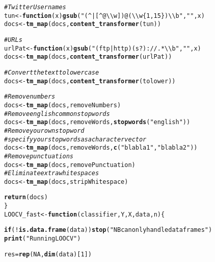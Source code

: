 \documentclass{article}\usepackage[]{graphicx}\usepackage[]{color}
\makeatletter
\newcommand{\hlnum}[1]{\textcolor[rgb]{0.686,0.059,0.569}{#1}}%
\newcommand{\hlstr}[1]{\textcolor[rgb]{0.192,0.494,0.8}{#1}}%
\newcommand{\hlcom}[1]{\textcolor[rgb]{0.678,0.584,0.686}{\textit{#1}}}%
\newcommand{\hlopt}[1]{\textcolor[rgb]{0,0,0}{#1}}%
\newcommand{\hlstd}[1]{\textcolor[rgb]{0.345,0.345,0.345}{#1}}%
\newcommand{\hlkwa}[1]{\textcolor[rgb]{0.161,0.373,0.58}{\textbf{#1}}}%
\newcommand{\hlkwb}[1]{\textcolor[rgb]{0.69,0.353,0.396}{#1}}%
\newcommand{\hlkwc}[1]{\textcolor[rgb]{0.333,0.667,0.333}{#1}}%
\newcommand{\hlkwd}[1]{\textcolor[rgb]{0.737,0.353,0.396}{\textbf{#1}}}%
\newenvironment{kframe}{%
 \def\at@end@of@kframe{}%
 \ifinner\ifhmode%
  \def\at@end@of@kframe{\end{minipage}}%
  \begin{minipage}{\columnwidth}%
 \fi\fi%
 \def\FrameCommand##1{\hskip\@totalleftmargin \hskip-\fboxsep
 \colorbox{shadecolor}{##1}\hskip-\fboxsep
     \hskip-\linewidth \hskip-\@totalleftmargin \hskip\columnwidth}%
 \MakeFramed {\advance\hsize-\width
   \@totalleftmargin\z@ \linewidth\hsize
   \@setminipage}}%
 {\par\unskip\endMakeFramed%
 \at@end@of@kframe}
\newenvironment{knitrout}{}{} %
\makeatother
\begin{document}
\begin{enumerate}
\begin{knitrout}
\begin{kframe}
\begin{alltt}
  \hlcom{# Twitter Usernames}
  \hlstd{tun}\hlkwb{<-}\hlkwa{function}\hlstd{(}\hlkwc{x}\hlstd{)} \hlkwd{gsub}\hlstd{(}\hlstr{"(^|[^@\textbackslash{}\textbackslash{}w])@(\textbackslash{}\textbackslash{}w\{1,15\})\textbackslash{}\textbackslash{}b"}\hlstd{,} \hlstr{""}\hlstd{, x)}
  \hlstd{docs}\hlkwb{<-} \hlkwd{tm_map}\hlstd{(docs,} \hlkwd{content_transformer}\hlstd{(tun))}


  \hlcom{# URLs }
  \hlstd{urlPat}\hlkwb{<-}\hlkwa{function}\hlstd{(}\hlkwc{x}\hlstd{)} \hlkwd{gsub}\hlstd{(}\hlstr{"(ftp|http)(s?)://.*\textbackslash{}\textbackslash{}b"}\hlstd{,} \hlstr{""}\hlstd{, x)}
  \hlstd{docs} \hlkwb{<-} \hlkwd{tm_map}\hlstd{(docs,} \hlkwd{content_transformer}\hlstd{(urlPat))}

  \hlcom{# Convert the text to lower case}
  \hlstd{docs} \hlkwb{<-} \hlkwd{tm_map}\hlstd{(docs,} \hlkwd{content_transformer}\hlstd{(tolower))}

  \hlcom{# Remove numbers}
  \hlstd{docs} \hlkwb{<-} \hlkwd{tm_map}\hlstd{(docs, removeNumbers)}
  \hlcom{# Remove english common stopwords}
  \hlstd{docs} \hlkwb{<-} \hlkwd{tm_map}\hlstd{(docs, removeWords,} \hlkwd{stopwords}\hlstd{(}\hlstr{"english"}\hlstd{))}
  \hlcom{# Remove your own stop word}
  \hlcom{# specify your stopwords as a character vector}
  \hlstd{docs} \hlkwb{<-} \hlkwd{tm_map}\hlstd{(docs, removeWords,} \hlkwd{c}\hlstd{(}\hlstr{"blabla1"}\hlstd{,} \hlstr{"blabla2"}\hlstd{))}
  \hlcom{# Remove punctuations}
  \hlstd{docs} \hlkwb{<-} \hlkwd{tm_map}\hlstd{(docs, removePunctuation)}
  \hlcom{# Eliminate extra white spaces}
  \hlstd{docs} \hlkwb{<-} \hlkwd{tm_map}\hlstd{(docs, stripWhitespace)}

  \hlkwd{return}\hlstd{(docs)}
\hlstd{\}}
\hlstd{LOOCV_fast} \hlkwb{<-} \hlkwa{function}\hlstd{(}\hlkwc{classifier}\hlstd{,} \hlkwc{Y}\hlstd{,} \hlkwc{X}\hlstd{,} \hlkwc{data}\hlstd{,} \hlkwc{n}\hlstd{)\{}

  \hlkwa{if} \hlstd{(}\hlopt{!}\hlkwd{is.data.frame}\hlstd{(data))} \hlkwd{stop}\hlstd{(}\hlstr{"NB can only handle data frames"}\hlstd{)}
  \hlkwd{print}\hlstd{(}\hlstr{"Running LOOCV"}\hlstd{)}

  \hlstd{res} \hlkwb{=} \hlkwd{rep}\hlstd{(}\hlnum{NA}\hlstd{,} \hlkwd{dim}\hlstd{(data)[}\hlnum{1}\hlstd{])}


\end{alltt}
\end{kframe}
\end{knitrout}
\end{enumerate}
\end{document}

